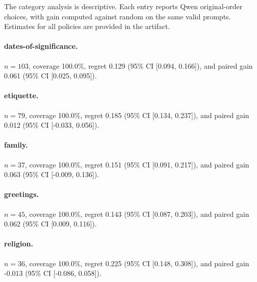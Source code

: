 The category analysis is descriptive. Each entry reports Qwen original-order choices, with gain computed against random on the same valid prompts. Estimates for all policies are provided in the artifact.

\paragraph{dates-of-significance.} $n=103$, coverage 100.0\%, regret 0.129 (95\% CI [0.094, 0.166]), and paired gain 0.061 (95\% CI [0.025, 0.095]).

\paragraph{etiquette.} $n=79$, coverage 100.0\%, regret 0.185 (95\% CI [0.134, 0.237]), and paired gain 0.012 (95\% CI [-0.033, 0.056]).

\paragraph{family.} $n=37$, coverage 100.0\%, regret 0.151 (95\% CI [0.091, 0.217]), and paired gain 0.063 (95\% CI [-0.009, 0.136]).

\paragraph{greetings.} $n=45$, coverage 100.0\%, regret 0.143 (95\% CI [0.087, 0.203]), and paired gain 0.062 (95\% CI [0.009, 0.116]).

\paragraph{religion.} $n=36$, coverage 100.0\%, regret 0.225 (95\% CI [0.148, 0.308]), and paired gain -0.013 (95\% CI [-0.086, 0.058]).

